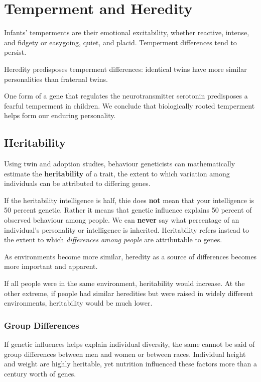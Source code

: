 \documentclass[12pt]{article}
\begin{document}
\section*{Temperment and Heredity}
Infants' temperments are their emotional excitability, whether reactive, intense, and fidgety or easygoing, quiet, and placid. Temperment differences tend to persist. 

Heredity predisposes temperment differences: identical twins have more similar personalities than fraternal twins.

One form of a gene that regulates the neurotransmitter serotonin predisposes a fearful temperment in children. We conclude that biologically rooted temperment helps form our enduring personality. 

\subsection*{Heritability}
Using twin and adoption studies, behaviour geneticists can mathematically estimate the \textbf{heritability} of a trait, the extent to which variation among individuals can be attributed to differing genes. 

If the heritability intelligence is half, thie does \textbf{not} mean that your intelligence is 50 percent genetic. Rather it means that genetic influence explains 50 percent of observed behaviour among people. We can \textbf{never} say what percentage of an individual's personality or intelligence is inherited. Heritability refers instead to the extent to which \textit{differences among people} are attributable to genes.

As environments become more similar, heredity as a source of differences becomes more important and apparent. 

If all people were in the same environment, heritability would increase. At the other extreme, if people had similar heredities but were raised in widely different environments, heritability would be much lower.

\subsubsection*{Group Differences}
If genetic influences helps explain individual diversity, the same cannot be said of group differences between men and women or between races. Individual height and weight are highly heritable, yet nutrition influenced these factors more than a century worth of genes.
\end{document}
